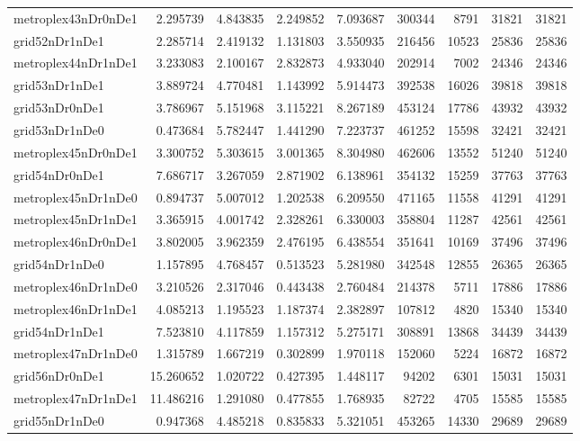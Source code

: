 \begin{longtable}{|l|r|r|r|r|r|r|r|r|}
metroplex43nDr0nDe1 & 2.295739 & 4.843835 & 2.249852 & 7.093687 & 300344 & 8791 & 31821 & 31821 \\
grid52nDr1nDe1 & 2.285714 & 2.419132 & 1.131803 & 3.550935 & 216456 & 10523 & 25836 & 25836 \\
metroplex44nDr1nDe1 & 3.233083 & 2.100167 & 2.832873 & 4.933040 & 202914 & 7002 & 24346 & 24346 \\
grid53nDr1nDe1 & 3.889724 & 4.770481 & 1.143992 & 5.914473 & 392538 & 16026 & 39818 & 39818 \\
grid53nDr0nDe1 & 3.786967 & 5.151968 & 3.115221 & 8.267189 & 453124 & 17786 & 43932 & 43932 \\
grid53nDr1nDe0 & 0.473684 & 5.782447 & 1.441290 & 7.223737 & 461252 & 15598 & 32421 & 32421 \\
metroplex45nDr0nDe1 & 3.300752 & 5.303615 & 3.001365 & 8.304980 & 462606 & 13552 & 51240 & 51240 \\
grid54nDr0nDe1 & 7.686717 & 3.267059 & 2.871902 & 6.138961 & 354132 & 15259 & 37763 & 37763 \\
metroplex45nDr1nDe0 & 0.894737 & 5.007012 & 1.202538 & 6.209550 & 471165 & 11558 & 41291 & 41291 \\
metroplex45nDr1nDe1 & 3.365915 & 4.001742 & 2.328261 & 6.330003 & 358804 & 11287 & 42561 & 42561 \\
metroplex46nDr0nDe1 & 3.802005 & 3.962359 & 2.476195 & 6.438554 & 351641 & 10169 & 37496 & 37496 \\
grid54nDr1nDe0 & 1.157895 & 4.768457 & 0.513523 & 5.281980 & 342548 & 12855 & 26365 & 26365 \\
metroplex46nDr1nDe0 & 3.210526 & 2.317046 & 0.443438 & 2.760484 & 214378 & 5711 & 17886 & 17886 \\
metroplex46nDr1nDe1 & 4.085213 & 1.195523 & 1.187374 & 2.382897 & 107812 & 4820 & 15340 & 15340 \\
grid54nDr1nDe1 & 7.523810 & 4.117859 & 1.157312 & 5.275171 & 308891 & 13868 & 34439 & 34439 \\
metroplex47nDr1nDe0 & 1.315789 & 1.667219 & 0.302899 & 1.970118 & 152060 & 5224 & 16872 & 16872 \\
grid56nDr0nDe1 & 15.260652 & 1.020722 & 0.427395 & 1.448117 & 94202 & 6301 & 15031 & 15031 \\
metroplex47nDr1nDe1 & 11.486216 & 1.291080 & 0.477855 & 1.768935 & 82722 & 4705 & 15585 & 15585 \\
grid55nDr1nDe0 & 0.947368 & 4.485218 & 0.835833 & 5.321051 & 453265 & 14330 & 29689 & 29689 \\

\end{longtable}
